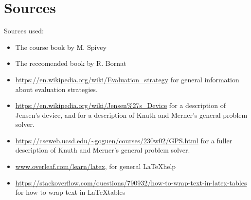 \documentclass[a4paper,9pt]{article}
\begin{document}
\section{Sources}
Sources used:
\begin{itemize}
    \item The course book by M. Spivey
    \item The reccomended book by R. Bornat
    \item \url{https://en.wikipedia.org/wiki/Evaluation\_strategy} for general information about evaluation strategies.
    \item \url{https://en.wikipedia.org/wiki/Jensen\%27s\_Device} for a description of Jensen's device, and for a description of Knuth and Merner's general problem solver.
    \item \url{https://cseweb.ucsd.edu/~goguen/courses/230w02/GPS.html} for a fuller description of Knuth and Merner's general problem solver.
    \item \url{www.overleaf.com/learn/latex}, for general \LaTeX help
    \item \url{https://stackoverflow.com/questions/790932/how-to-wrap-text-in-latex-tables} for how to wrap text in \LaTeX  tables
\end{itemize}
\end{document}
